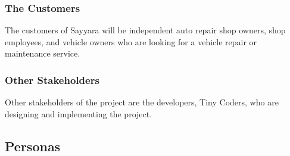 \documentclass[12pt]{article}
\begin{document}
\subsubsection{The Customers}
The customers of Sayyara will be independent auto repair shop owners, shop employees, and vehicle
owners who are looking for a vehicle repair or maintenance service.

\subsubsection{Other Stakeholders}
Other stakeholders of the project are the developers, Tiny Coders, who are designing and
implementing the project.

\subsection{Personas}
\end{document}
